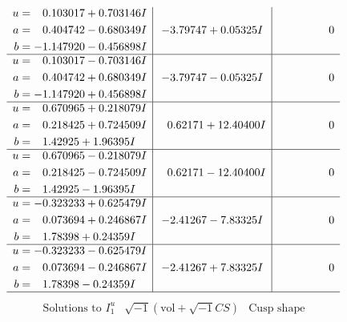 \documentclass[1p]{elsarticle_modified}
\theoremstyle{definition}
\newcommand{\I}{\sqrt{-1}}
\begin{document}
$$\begin{array}{c|c|c}
\begin{aligned}
u &= \phantom{-}0.103017 + 0.703146 I \\
a &= \phantom{-}0.404742 - 0.680349 I \\
b &= -1.147920 - 0.456898 I\end{aligned}
 & -3.79747 + 0.05325 I & \phantom{-0.000000 } 0 \\ \hline\begin{aligned}
u &= \phantom{-}0.103017 - 0.703146 I \\
a &= \phantom{-}0.404742 + 0.680349 I \\
b &= -1.147920 + 0.456898 I\end{aligned}
 & -3.79747 - 0.05325 I & \phantom{-0.000000 } 0 \\ \hline\begin{aligned}
u &= \phantom{-}0.670965 + 0.218079 I \\
a &= \phantom{-}0.218425 + 0.724509 I \\
b &= \phantom{-}1.42925 + 1.96395 I\end{aligned}
 & \phantom{-}0.62171 + 12.40400 I & \phantom{-0.000000 } 0 \\ \hline\begin{aligned}
u &= \phantom{-}0.670965 - 0.218079 I \\
a &= \phantom{-}0.218425 - 0.724509 I \\
b &= \phantom{-}1.42925 - 1.96395 I\end{aligned}
 & \phantom{-}0.62171 - 12.40400 I & \phantom{-0.000000 } 0 \\ \hline\begin{aligned}
u &= -0.323233 + 0.625479 I \\
a &= \phantom{-}0.073694 + 0.246867 I \\
b &= \phantom{-}1.78398 + 0.24359 I\end{aligned}
 & -2.41267 - 7.83325 I & \phantom{-0.000000 } 0 \\ \hline\begin{aligned}
u &= -0.323233 - 0.625479 I \\
a &= \phantom{-}0.073694 - 0.246867 I \\
b &= \phantom{-}1.78398 - 0.24359 I\end{aligned}
 & -2.41267 + 7.83325 I & \phantom{-0.000000 } 0\\
 \hline 
 \end{array}$$\newpage$$\begin{array}{c|c|c}  
\text{Solutions to }I^u_{1}& \I (\text{vol} + \sqrt{-1}CS) & \text{Cusp shape}\\

\end{array}$$
\end{document}
